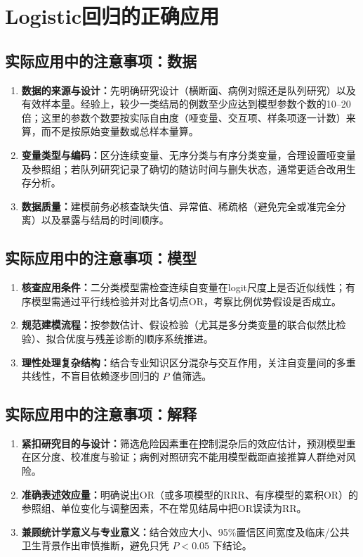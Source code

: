 \section{Logistic回归的正确应用}
\subsection{实际应用中的注意事项：数据}
\begin{enumerate}
\item \textbf{数据的来源与设计：}先明确研究设计（横断面、病例对照还是队列研究）以及有效样本量。经验上，较少一类结局的例数至少应达到模型参数个数的10--20倍；这里的参数个数要按实际自由度（哑变量、交互项、样条项逐一计数）来算，而不是按原始变量数或总样本量算。
\item \textbf{变量类型与编码：}区分连续变量、无序分类与有序分类变量，合理设置哑变量及参照组；若队列研究记录了确切的随访时间与删失状态，通常更适合改用生存分析。
\item \textbf{数据质量：}建模前务必核查缺失值、异常值、稀疏格（避免完全或准完全分离）以及暴露与结局的时间顺序。
\end{enumerate}
\subsection{实际应用中的注意事项：模型}
\begin{enumerate}
\item \textbf{核查应用条件：}二分类模型需检查连续自变量在logit尺度上是否近似线性；有序模型需通过平行线检验并对比各切点OR，考察比例优势假设是否成立。
\item \textbf{规范建模流程：}按参数估计、假设检验（尤其是多分类变量的联合似然比检验）、拟合优度与残差诊断的顺序系统推进。
\item \textbf{理性处理复杂结构：}结合专业知识区分混杂与交互作用，关注自变量间的多重共线性，不盲目依赖逐步回归的 $P$ 值筛选。
\end{enumerate}
\subsection{实际应用中的注意事项：解释}
\begin{enumerate}
\item \textbf{紧扣研究目的与设计：}筛选危险因素重在控制混杂后的效应估计，预测模型重在区分度、校准度与验证；病例对照研究不能用模型截距直接推算人群绝对风险。
\item \textbf{准确表述效应量：}明确说出OR（或多项模型的RRR、有序模型的累积OR）的参照组、单位变化与调整因素，不在常见结局中把OR误读为RR。
\item \textbf{兼顾统计学意义与专业意义：}结合效应大小、95\%置信区间宽度及临床/公共卫生背景作出审慎推断，避免只凭 $P<0.05$ 下结论。
\end{enumerate}
